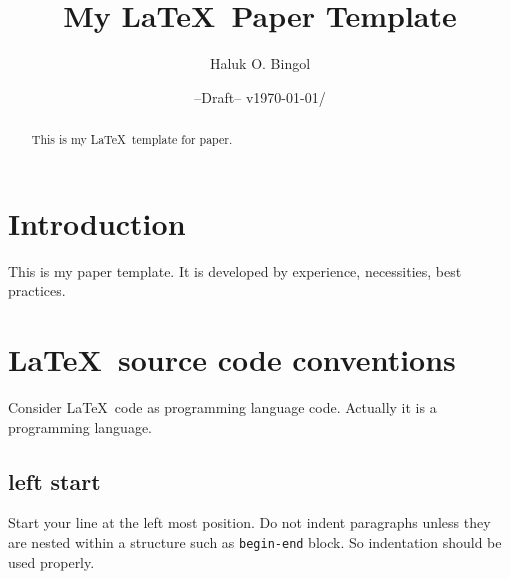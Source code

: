 \documentclass[pre,twocolumn,showkeys,longbibliography]{revtex4-1}
\newcommand{\hbTimeStamp}{{\color{red}--Draft-- v\today/\currenttime}} %
\theoremstyle{plain}%
\theoremstyle{definition}
\theoremstyle{remark}
\begin{document}



\title{
	My \LaTeX\ Paper Template 
}
\author{Haluk O. Bingol}

\date{\hbTimeStamp}

\begin{abstract}
	This is my \LaTeX\ template for paper.
\end{abstract}




\maketitle
\tableofcontents






\section{Introduction}

This is my paper template. 
It is developed by experience, necessities, best practices.





\section{\LaTeX\ source code conventions}

Consider \LaTeX\ code as programming language code. 
Actually it is a programming language.




\subsection{left start}

Start your line at the left most position.
Do not indent paragraphs unless they are nested within a structure such as \verb!begin-end! block.
So indentation should be used properly.
\end{document}

